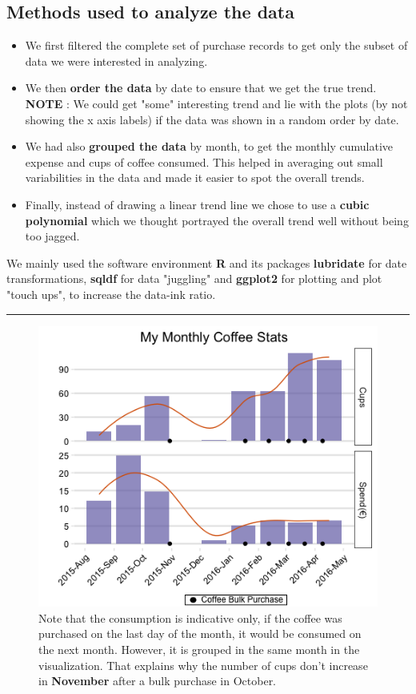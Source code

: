 \documentclass[a4paper,11pt]{article}
\begin{document}
\begin{multicols}{2}
\section*{Methods used to analyze the data}
\begin{itemize}
	\item We first filtered the complete set of purchase records to get only the subset of data we were interested in analyzing.
	\item We then \textbf{order the data} by date to ensure that we get the true trend. \textbf{NOTE} : We could get "some" interesting trend and lie with the plots (by not showing the x axis labels) if the data was shown in a random order by date.
	\item We had also \textbf{grouped the data} by month, to get the monthly cumulative expense and cups of coffee consumed. This helped in averaging out small variabilities in the data and made it easier to spot the overall trends.
	\item Finally, instead of drawing a linear trend line we chose to use a \textbf{cubic polynomial} which we thought portrayed the overall trend well without being too jagged.
\end{itemize}
We mainly used the software environment \textbf{R} and its packages \textbf{lubridate} for date transformations, \textbf{sqldf} for data "juggling" and \textbf{ggplot2} for plotting and plot "touch ups", to increase the data-ink ratio.
\end{multicols}
\hrule
\begin{figure}[h]
	\centering
	\includegraphics[scale=0.8]{FinalVis-2.png}
	\caption{Note that the consumption is indicative only, if the coffee was purchased on the last day of the month, it would be consumed on the next month. However, it is grouped in the same month in the visualization. That explains why the number of cups don't increase in \textbf{November} after a bulk purchase in October.
	}
	\label{fig}
\end{figure}
\end{document}
